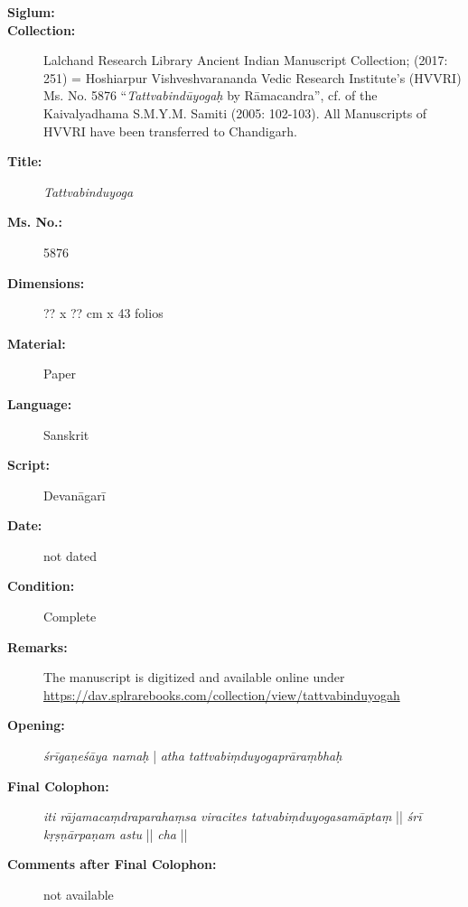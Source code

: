 \begin{description}
\item[\textbf{Siglum:}] \Huge{} \nocite{ytbl}
\item[\textbf{Collection:}] Lalchand Research Library Ancient Indian Manuscript Collection;  (2017: 251) = Hoshiarpur Vishveshvarananda Vedic Research Institute's (HVVRI) Ms. No. 5876 ``\emph{Tattvabindūyogaḥ} by Rāmacandra'', cf.  of the Kaivalyadhama S.M.Y.M. Samiti (2005: 102-103). All Manuscripts of HVVRI have been transferred to Chandigarh. 
\item[\textbf{Title:}] \emph{Tattvabinduyoga} 
\item[\textbf{Ms. No.:}] 5876
\item[\textbf{Dimensions:}] ?? x ?? cm x 43 folios 
\item[\textbf{Material:}] Paper
\item[\textbf{Language:}] Sanskrit
\item[\textbf{Script:}] Devanāgarī
\item[\textbf{Date:}] not dated
\item[\textbf{Condition:}] Complete 
\item[\textbf{Remarks:}] The manuscript is digitized and available online under \url{https://dav.splrarebooks.com/collection/view/tattvabinduyogah}
\item[\textbf{Opening:}] \textit{śrīgaṇeśāya namaḥ} | \textit{atha tattvabiṃduyogaprāraṃbhaḥ}
\item[\textbf{Final Colophon:}] \textit{iti rājamacaṃdraparahaṃsa viracites tatvabiṃduyogasamāptaṃ} || \textit{śrī kṛṣṇārpaṇam astu} || \textit{cha} ||
\item[\textbf{Comments after Final Colophon:}] not available  
\end{description}
\newpage
